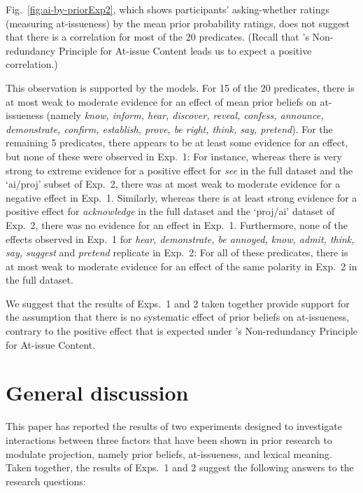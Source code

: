 \documentclass[11pt,fleqn]{article}
\newcommand{\6}{\mbox{$[\hspace*{-.6mm}[$}}
\newcommand{\9}{\mbox{$]\hspace*{-.6mm}]$}}
\newcommand{\citepos}[1]{\citeauthor{#1}'s \citeyear{#1}}
\begin{document}
Fig.~\ref{fig:ai-by-priorExp2}, which shows participants' asking-whether ratings (measuring at-issueness) by the mean prior probability ratings, does not suggest that there is a correlation for most of the 20 predicates. (Recall that \citepos{tonhauser-etal-eval} Non-redundancy Principle for At-issue Content leads us to expect a positive correlation.)

This observation is supported by the models. For 15 of the 20 predicates, there is at most weak to moderate evidence for an effect of mean prior beliefs on at-issueness (namely {\em know, inform, hear, discover, reveal, confess, announce, demonstrate, confirm, establish, prove, be right, think, say, pretend}). For the remaining 5 predicates, there appears to be at least some evidence for an effect, but none of these were observed in Exp.~1: For instance, whereas there is very strong to extreme evidence for a positive effect for {\em see} in the full dataset and the `ai/proj' subset of Exp.~2, there was at most weak to moderate evidence for a negative effect in Exp.~1. Similarly, whereas there is at least strong evidence for a positive effect for {\em acknowledge} in the full dataset and the `proj/ai' dataset of Exp.~2, there was no evidence for an effect in Exp.~1. Furthermore, none of the effects observed in Exp.~1 for {\em hear, demonstrate, be annoyed, know, admit, think, say, suggest} and {\em pretend} replicate in Exp.~2: For all of these predicates, there is at most weak to moderate evidence for an effect of the same polarity in Exp.~2 in the full dataset. 

We suggest that the results of Exps.~1 and 2 taken together provide support for the assumption that there is no systematic effect of prior beliefs on at-issueness, contrary to the positive effect that is expected under \citepos{tonhauser-etal-eval} Non-redundancy Principle for At-issue Content.

\section{General discussion}\label{s4}

This paper has reported the results of two experiments designed to investigate interactions between three factors that have been shown in prior research to modulate projection, namely prior beliefs, at-issueness, and lexical meaning. Taken together, the results of Exps.~1 and 2 suggest the following answers to the research questions:
\end{document}
